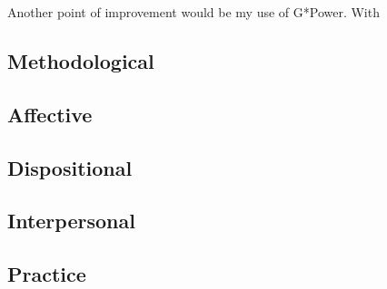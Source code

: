 \documentclass[conference]{IEEEtran}
\begin{document}


Another point of improvement would be my use of G*Power. With 

\subsection{Methodological}

\subsection{Affective}
\subsection{Dispositional}
\subsection{Interpersonal}
\subsection{Practice}
\end{document}
